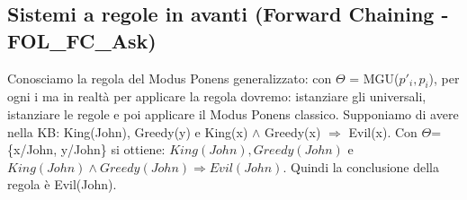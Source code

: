 \documentclass{article}
\begin{document}
\subsection{Sistemi a regole in avanti (Forward Chaining - FOL\_FC\_Ask)}
Conosciamo la regola del Modus Ponens generalizzato: \quad
{} \newline
con $\Theta$ = MGU($p'_{i}, p_{i}$), per ogni i \newline
ma in realtà per applicare la regola dovremo: istanziare gli universali, istanziare le regole e poi applicare il Modus Ponens classico. \newline
Supponiamo di avere nella KB: King(John), Greedy(y) e King(x) $\land$ Greedy(x) $\Rightarrow$ Evil(x). \newline 
Con  $\Theta$=\{x/John, y/John\} si ottiene: \newline 
$King(John), Greedy(John)$ e $King(John) \land Greedy(John) \Rightarrow Evil(John)$. \newline 
Quindi la conclusione della regola è Evil(John).
\end{document}
